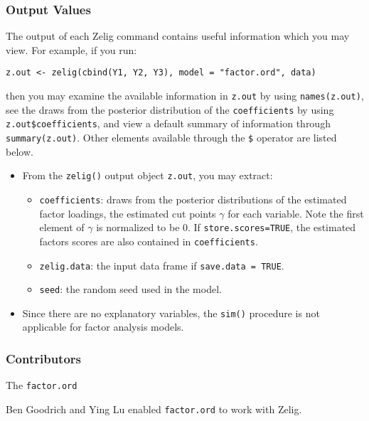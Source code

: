 \subsubsection{Output Values}

The output of each Zelig command contains useful information which you
may view. For example, if you run:
\begin{verbatim}
z.out <- zelig(cbind(Y1, Y2, Y3), model = "factor.ord", data)
\end{verbatim}

\noindent then you may examine the available information in \texttt{z.out} by
using \texttt{names(z.out)}, see the draws from the posterior
distribution of the \texttt{coefficients} by using
\texttt{z.out\$coefficients}, and view a default summary of
information through \texttt{summary(z.out)}. Other elements available
through the \texttt{\$} operator are listed below.

\begin{itemize}
\item From the \texttt{zelig()} output object \texttt{z.out}, you may extract:

\begin{itemize}
\item \texttt{coefficients}: draws from the posterior distributions
of the estimated factor loadings, the estimated cut points $\gamma$ for each
variable. Note the first element of $\gamma$ is normalized to be 0. If 
\texttt{store.scores=TRUE}, the estimated factors scores are also contained in 
\texttt{coefficients}.

   \item {\tt zelig.data}: the input data frame if {\tt save.data = TRUE}.  

\item \texttt{seed}: the random seed used in the model.   

\end{itemize}

\item Since there are no explanatory variables, the \texttt{sim()} procedure is
not applicable for factor analysis models.

\end{itemize}

\subsubsection{Contributors}
The \texttt{factor.ord} 

\noindent Ben Goodrich and Ying Lu enabled \texttt{factor.ord} to work with Zelig.

